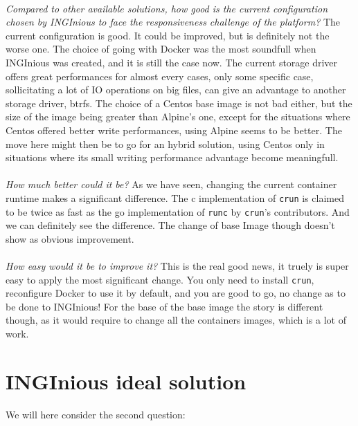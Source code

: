\paragraph{}\textit{Compared to other available solutions, how good is the current configuration chosen by INGInious to face the responsiveness challenge of the platform?}  The current configuration is good.  It could be improved, but is definitely not the worse one.  The choice of going with Docker was the most soundfull when INGInious was created, and it is still the case now.  The current storage driver offers great performances for almost every cases, only some specific case, sollicitating a lot of IO operations on big files, can give an advantage to another storage driver, btrfs.  The choice of a Centos base image is not bad either, but the size of the image being greater than Alpine's one, except for the situations where Centos offered better write performances, using Alpine seems to be better.  The move here might then be to go for an hybrid solution, using Centos only in situations where its small writing performance advantage become meaningfull.  
\paragraph{}\textit{How much better could it be?}  As we have seen, changing the current container runtime makes a significant difference.  The c implementation of \texttt{crun} is claimed to be twice as fast as the go implementation of \texttt{runc} by \texttt{crun}'s contributors.  And we can definitely see the difference.  The change of base Image though doesn't show as obvious improvement.
\paragraph{}\textit{How easy would it be to improve it?}  This is the real good news, it truely is super easy to apply the most significant change.  You only need to install \texttt{crun}, reconfigure Docker to use it by default, and you are good to go, no change as to be done to INGInious!  For the base of the base image the story is different though, as it would require to change all the containers images, which is a lot of work.

\section{INGInious ideal solution}
We will here consider the second question:
\begin{center}
\end{center}

